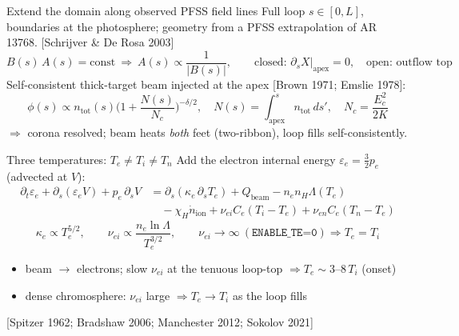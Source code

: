 \documentclass[aspectratio=169]{beamer}
\newcommand{\cit}[1]{{\scriptsize\color{gray}[#1]}}
\begin{document}
\begin{frame}{Extend the domain along observed PFSS field lines}
  Full loop $s\in[0,L]$, boundaries at the \alert{photosphere}; geometry from a PFSS
  extrapolation of AR\,13768. \cit{Schrijver \& De Rosa 2003}
  \[
    B(s)\,A(s)=\text{const}\ \Rightarrow\ A(s)\propto\frac{1}{|B(s)|},\qquad
    \text{closed: }\partial_s X|_\mathrm{apex}=0,\quad \text{open: outflow top}
  \]
  Self-consistent thick-target beam injected at the apex \cit{Brown 1971; Emslie 1978}:
  \[
    \phi(s)\propto n_\mathrm{tot}(s)\Big(1+\frac{N(s)}{N_c}\Big)^{-\delta/2},\quad
    N(s)=\!\int_\mathrm{apex}^{s}\!\! n_\mathrm{tot}\,ds',\quad
    N_c=\frac{E_c^{2}}{2K}
  \]
  $\Rightarrow$ corona resolved; beam heats \emph{both} feet (two-ribbon), loop fills self-consistently.
\end{frame}

\begin{frame}{Three temperatures: $T_e \neq T_i \neq T_n$}
  Add the electron internal energy $\varepsilon_e=\tfrac32 p_e$ (advected at $V$):
  \begin{align*}
    \partial_t\varepsilon_e+\partial_s(\varepsilon_e V)+p_e\,\partial_s V
      &=\partial_s(\kappa_e\,\partial_s T_e)+Q_\mathrm{beam}-n_e n_H\Lambda(T_e)\\
      &\quad-\chi_H\dot{n}_\mathrm{ion}+\nu_{ei}C_e(T_i-T_e)+\nu_{en}C_e(T_n-T_e)
  \end{align*}
  \[
    \kappa_e\propto T_e^{5/2},\qquad
    \nu_{ei}\propto\frac{n_e\ln\Lambda}{T_e^{3/2}},\qquad
    \nu_{ei}\!\to\!\infty\ (\texttt{ENABLE\_TE=0})\Rightarrow T_e=T_i
  \]
  \begin{itemize}\setlength\itemsep{2pt}
    \item beam $\to$ electrons; slow $\nu_{ei}$ at the tenuous loop-top $\Rightarrow T_e\sim3\text{--}8\,T_i$ (onset)
    \item dense chromosphere: $\nu_{ei}$ large $\Rightarrow T_e\to T_i$ as the loop fills
  \end{itemize}
  \cit{Spitzer 1962; Bradshaw 2006; Manchester 2012; Sokolov 2021}
\end{frame}

\end{document}

